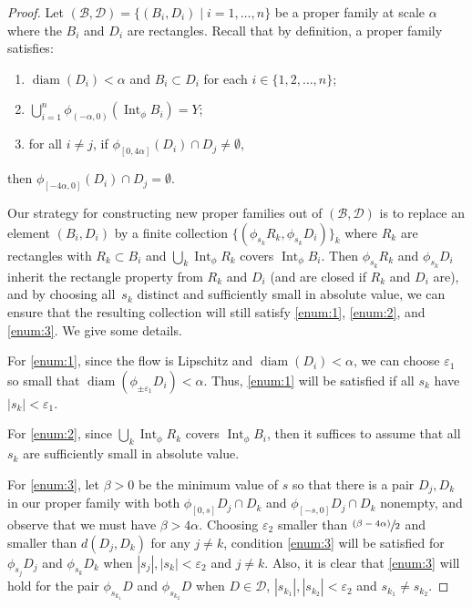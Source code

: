 \documentclass[JEP,XML,SOM,Unicode,NoFloatCountersInSection]{cedram}
\let\mathcal\mathscr
\let\epsilon\varepsilon
\let\sep\mid
\newcommand{\psfrac}[2]{\sfrac{(#1)}{#2}}
\theoremstyle{definition}
\numberwithin{equation}{section}
\DeclareMathOperator{\diam}{diam}
\DeclareMathOperator{\Int}{Int}
\newcommand\DDD{\mathcal D}
\newcommand\BBB{\mathcal B}
\begin{document}
\begin{proof}
Let $(\mathcal{B},\mathcal{D})= \{(B_i, D_i) \sep i = 1, \ldots, n \}$ be a proper family at scale $\alpha$ where the $B_i$ and $D_i$ are rectangles. Recall that by definition, a proper family satisfies:
\begin{enumerate}
\item\label{enum:1}
$\diam (D_i)< \alpha$ and $B_i \subset D_i$ for each $i \in \{1, 2, \ldots, n\}$;
\item\label{enum:2}
$\bigcup_{i=1}^n\phi_{(-\alpha, 0)} (\Int_\phi B_i)=Y$;
\item\label{enum:3}
for all $i\neq j$, if $\phi_{[0, 4\alpha]}(D_i) \cap D_j \neq \emptyset$, 
\end{enumerate}
then $\phi_{[-4\alpha, 0]}(D_i) \cap D_j = \emptyset$.

Our strategy for constructing new proper families out of $(\BBB, \DDD)$ is to replace an element $(B_i, D_i)$ by a finite collection $\{ (\phi_{s_k}R_k, \phi_{s_k}D_i) \}_k$ where $R_k$ are rectangles with $R_k \subset B_i$ and $\bigcup_k \Int_\phi R_k$ covers $\Int_\phi B_i$. Then $\phi_{s_k}R_k$ and $\phi_{s_k}D_i$ inherit the rectangle property from $R_k$ and $D_i$ (and are closed if $R_k$ and $D_i$ are), and by choosing all~$s_k$ distinct and sufficiently small in absolute value, we can ensure that the resulting collection will still satisfy \eqref{enum:1}, \eqref{enum:2}, and \eqref{enum:3}. We give some details.

For \eqref{enum:1}, since the flow is Lipschitz and $\diam(D_{i})<\alpha$, we can choose $\epsilon_1$ so small that $\diam(\phi_{\pm\epsilon_1}D_{i})<\alpha$. Thus, \eqref{enum:1} will be satisfied if all $s_k$ have $|s_k| < \epsilon_1$.

For \eqref{enum:2}, since $\bigcup_k \Int_\phi R_k$ covers $\Int_\phi B_i$, then it suffices to assume that all $s_k$ are sufficiently small in absolute value.

For \eqref{enum:3}, let $\beta>0$ be the minimum value of $s$ so that there is a pair $D_j, D_k$ in our proper family with both $\phi_{[0,s]} D_j \cap D_k$ and $\phi_{[-s,0]} D_j \cap D_k$ nonempty, and observe that we must have $\beta>4\alpha$. Choosing $\epsilon_2$ smaller than $\psfrac{\beta-4\alpha}{2}$ and smaller than $d(D_j, D_k)$ for any $j\neq k$, condition \eqref{enum:3} will be satisfied for $\phi_{s_j} D_j$ and $\phi_{s_k}D_k$ when $|s_j|, |s_k| < \epsilon_2$ and $j\neq k$. Also, it is clear that \eqref{enum:3} will hold for the pair $\phi_{s_{k_1}} D$ and $\phi_{s_{k_2}}D$ when $D \in \DDD$, $|s_{k_1}|, |s_{k_2}| < \epsilon_2$ and $s_{k_1} \neq s_{k_2}$.


\end{proof}
\end{document}
